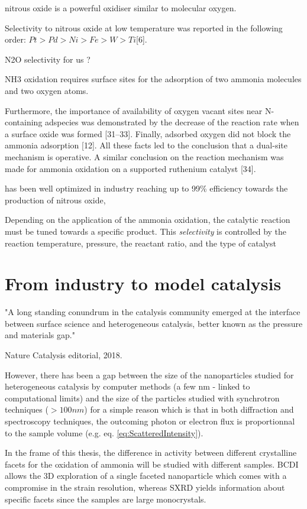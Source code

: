 nitrous oxide is a powerful oxidiser similar to molecular oxygen.

Selectivity to nitrous oxide at low temperature was reported in the following order: $Pt > Pd > Ni > Fe > W > Ti $[6].

N2O selectivity for us ?

NH3 oxidation requires surface sites for the adsorption of two ammonia molecules and two oxygen atoms.

Furthermore, the importance of availability of oxygen vacant sites near N-containing adspecies was demonstrated by the decrease of the reaction rate when a surface oxide was formed [31–33].
Finally, adsorbed oxygen did not block the ammonia adsorption [12].
All these facts led to the conclusion that a dual-site mechanism is operative.
A similar conclusion on the reaction mechanism was made for ammonia oxidation on a supported ruthenium catalyst [34].

has been well optimized in industry reaching up to 99\% efficiency towards the production of nitrous oxide,

Depending on the application of the ammonia oxidation, the catalytic reaction must be tuned towards a specific product.
This \textit{selectivity} is controlled by the reaction temperature, pressure, the  reactant ratio, and the type of catalyst

\section{From industry to model catalysis}

"A long standing conundrum in the catalysis community emerged at the interface between surface science and heterogeneous catalysis, better known as the pressure and materials gap."

Nature Catalysis editorial, 2018.


However, there has been a gap between the size of the nanoparticles studied for heterogeneous catalysis by computer methods (a few nm - linked to computational limits) and the size of the particles studied with synchrotron techniques ($>100 nm$) for a simple reason which is that in both diffraction and spectroscopy techniques, the outcoming photon or electron flux is proportionnal to the sample volume (e.g. eq. \ref{eq:ScatteredIntensity}).

In the frame of this thesis, the difference in activity between different crystalline facets for the oxidation of ammonia will be studied with different samples.
BCDI allows the 3D exploration of a single faceted nanoparticle which comes with a compromise in the strain resolution, whereas SXRD yields information about specific facets since the samples are large monocrystals.

